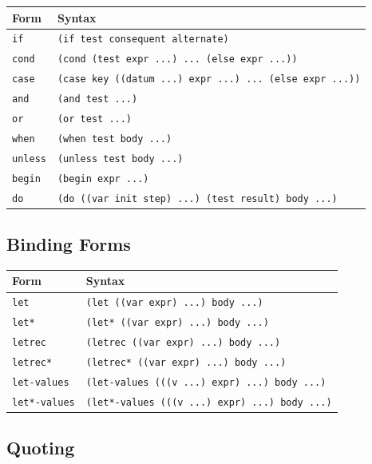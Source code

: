 \begin{center}
\small
\begin{tabularx}{\textwidth}{@{}lY@{}}
\textbf{Form} & \textbf{Syntax} \\
\hline
\texttt{if} & \texttt{(if test consequent alternate)} \\
\texttt{cond} & \texttt{(cond (test expr ...) ... (else expr ...))} \\
\texttt{case} & \texttt{(case key ((datum ...) expr ...) ... (else expr ...))} \\
\texttt{and} & \texttt{(and test ...)} \\
\texttt{or} & \texttt{(or test ...)} \\
\texttt{when} & \texttt{(when test body ...)} \\
\texttt{unless} & \texttt{(unless test body ...)} \\
\texttt{begin} & \texttt{(begin expr ...)} \\
\texttt{do} & \texttt{(do ((var init step) ...) (test result) body ...)} \\
\end{tabularx}
\end{center}

\subsection*{Binding Forms}

\begin{center}
\small
\begin{tabularx}{\textwidth}{@{}lY@{}}
\textbf{Form} & \textbf{Syntax} \\
\hline
\texttt{let} & \texttt{(let ((var expr) ...) body ...)} \\
\texttt{let*} & \texttt{(let* ((var expr) ...) body ...)} \\
\texttt{letrec} & \texttt{(letrec ((var expr) ...) body ...)} \\
\texttt{letrec*} & \texttt{(letrec* ((var expr) ...) body ...)} \\
\texttt{let-values} & \texttt{(let-values (((v ...) expr) ...) body ...)} \\
\texttt{let*-values} & \texttt{(let*-values (((v ...) expr) ...) body ...)} \\
\end{tabularx}
\end{center}

\subsection*{Quoting}

